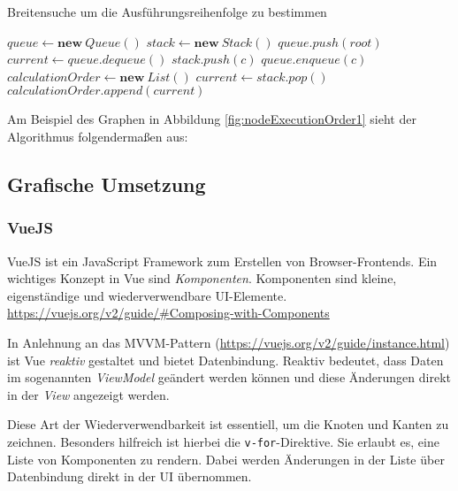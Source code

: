 \begin{algorithm}[H]
    \caption{Breitensuche um die Ausführungsreihenfolge zu bestimmen}
    \begin{algorithmic}[1]
        \State $queue \gets \textbf{new} \ Queue()$
        \State $stack \gets \textbf{new} \ Stack()$
        \State $queue.push(root)$
            \State $current \gets queue.dequeue()$
                \State $stack.push(c)$
                \State $queue.enqueue(c)$
            \EndFor
        \EndWhile
        \State $calculationOrder \gets \textbf{new} \ List()$
            \State $current \gets stack.pop()$
                \State $calculationOrder.append(current)$
            \EndIf
        \EndWhile
    \end{algorithmic}
\end{algorithm}

Am Beispiel des Graphen in Abbildung \ref{fig:nodeExecutionOrder1} sieht der Algorithmus folgendermaßen aus:

\todo

\subsection{Grafische Umsetzung}

\subsubsection{VueJS}
VueJS ist ein JavaScript Framework zum Erstellen von Browser-Frontends. Ein wichtiges Konzept in Vue sind \textit{Komponenten}. Komponenten sind kleine, eigenständige und wiederverwendbare UI-Elemente. \url{https://vuejs.org/v2/guide/#Composing-with-Components}

In Anlehnung an das MVVM-Pattern (\url{https://vuejs.org/v2/guide/instance.html}) ist Vue \textit{reaktiv} gestaltet und bietet Datenbindung. Reaktiv bedeutet, dass Daten im sogenannten \textit{ViewModel} geändert werden können und diese Änderungen direkt in der \textit{View} angezeigt werden. 

Diese Art der Wiederverwendbarkeit ist essentiell, um die Knoten und Kanten zu zeichnen. Besonders hilfreich ist hierbei die \texttt{v-for}-Direktive. Sie erlaubt es, eine Liste von Komponenten zu rendern. Dabei werden Änderungen in der Liste über Datenbindung direkt in der UI übernommen. 



